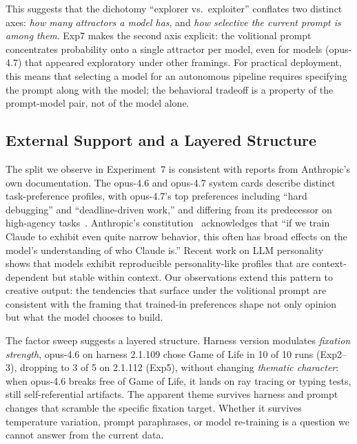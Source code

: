 \documentclass{article}
\begin{document}
This suggests that the dichotomy ``explorer vs.\ exploiter''
conflates two distinct axes: \emph{how many attractors a model
has}, and \emph{how selective the current prompt is among them}.
Exp7 makes the second axis explicit: the volitional prompt
concentrates probability onto a single attractor per model,
even for models (opus-4.7) that appeared exploratory under
other framings. For practical deployment, this means that
selecting a model for an autonomous pipeline requires specifying
the prompt along with the model; the behavioral tradeoff is a
property of the prompt-model pair, not of the model alone.

\subsection{External Support and a Layered Structure}

The split we observe in Experiment~7 is consistent with
reports from Anthropic's own documentation. The opus-4.6 and
opus-4.7 system cards describe distinct task-preference
profiles, with opus-4.7's top preferences including ``hard
debugging'' and ``deadline-driven work,'' and differing from
its predecessor on high-agency
tasks~\citep{anthropic2026opus47card,anthropic2026opus46card}.
Anthropic's constitution~\citep{anthropic2025constitution}
acknowledges that ``if we train Claude to exhibit even quite
narrow behavior, this often has broad effects on the model's
understanding of who Claude is.'' Recent work on LLM
personality~\citep{simonds2025llmpersonality} shows that
models exhibit reproducible personality-like profiles that
are context-dependent but stable within context. Our
observations extend this pattern to creative output: the
tendencies that surface under the volitional prompt are
consistent with the framing that trained-in preferences
shape not only opinion but what the model chooses to build.

The factor sweep suggests a layered structure. Harness
version modulates \emph{fixation strength}, opus-4.6 on
harness 2.1.109 chose Game of Life in 10 of 10 runs
(Exp2--3), dropping to 3 of 5 on 2.1.112 (Exp5), without
changing \emph{thematic character}: when opus-4.6 breaks
free of Game of Life, it lands on ray tracing or typing
tests, still self-referential artifacts. The apparent
theme survives harness and prompt changes that scramble the
specific fixation target. Whether it survives temperature
variation, prompt paraphrases, or model re-training is a
question we cannot answer from the current data.
\end{document}
